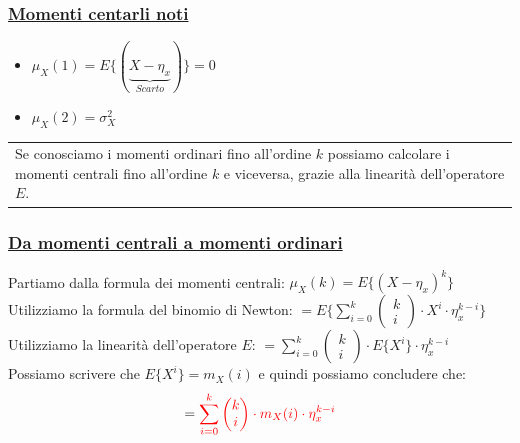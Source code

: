 \documentclass{article}
\begin{document}
\subsubsection{\underline{Momenti centarli noti}}
\begin{itemize}
    \item $\mu_X(1) = E \big\{ ( \underset{Scarto}{\underbrace{X-\eta_x}} )\big\} = 0$
    \item $\mu_X(2) = \sigma_X^2$
\end{itemize}
\begin{tabular}{|p{13cm}}
Se conosciamo i momenti ordinari fino all’ordine $k$ possiamo calcolare i momenti centrali fino all’ordine $k$ e viceversa, grazie alla linearità dell’operatore $E$.
\end{tabular}
\subsubsection{\underline{Da momenti centrali a momenti ordinari}}
Partiamo dalla formula dei momenti centrali: $\mu_X(k) = E\Big\{ \left(X-\eta_x\right)^k\Big\}$ \\
Utilizziamo la formula del binomio di Newton: $= E\Bigg\{ \sum_{i=0}^{k} \left( \begin{matrix} k \\ i\end{matrix} \right) \cdot X^i \cdot \eta_x^{k-i}\Bigg\}$ \\
Utilizziamo la linearità dell’operatore $E$: $= \sum_{i=0}^{k} \left( \begin{matrix} k \\ i\end{matrix} \right) \cdot E\Big\{  X^i \Big\} \cdot \eta_x^{k-i}$ \\
Possiamo scrivere che $E\Big\{  X^i \Big \} = m_X(i)$ e quindi possiamo concludere che:
\[= \color{red} \sum_{i=0}^{k} \left( \begin{matrix} k \\ i\end{matrix} \right) \cdot m_X(i) \cdot \eta_x^{k-i}\]
\end{document}

